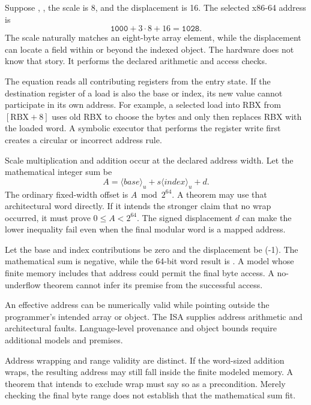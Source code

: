 Suppose , , the scale is 8, and the displacement
is 16. The selected x86-64 address is
\[
  \mathtt{1000}+3\mathbin{\cdot}8+16=\mathtt{1028}.
\]
The scale naturally matches an eight-byte array element, while the displacement
can locate a field within or beyond the indexed object. The hardware does not
know that story. It performs the declared arithmetic and access checks.

The equation reads all contributing registers from the entry state. If the
destination register of a load is also the base or index, its new value cannot
participate in its own address. For example, a selected load into RBX from
\([\mathrm{RBX}+8]\) uses old RBX to choose the bytes and only then replaces
RBX with the loaded word. A symbolic executor that performs the register write
first creates a circular or incorrect address rule.

Scale multiplication and addition occur at the declared address width. Let
the mathematical integer sum be
\[
  A=\langle base\rangle_u+s\langle index\rangle_u+d.
\]
The ordinary fixed-width offset is \(A\bmod 2^{64}\). A theorem may use that
architectural word directly. If it intends the stronger claim that no wrap
occurred, it must prove \(0\leq A<2^{64}\). The signed displacement \(d\) can
make the lower inequality fail even when the final modular word is a mapped
address.

\begin{example}[title={A valid final address after mathematical underflow}]
Let the base and index contributions be zero and the displacement be (-1).
The mathematical sum is negative, while the 64-bit word result is
. A model whose finite memory includes that address
could permit the final byte access. A no-underflow theorem cannot infer its
premise from the successful access.
\end{example}

\begin{warning}[title={Address arithmetic is not an object-bounds proof}]
An effective address can be numerically valid while pointing outside the
programmer's intended array or object. The ISA supplies address arithmetic and
architectural faults. Language-level provenance and object bounds require
additional models and premises.
\end{warning}

Address wrapping and range validity are distinct. If the word-sized addition
wraps, the resulting address may still fall inside the finite modeled memory.
A theorem that intends to exclude wrap must say so as a precondition. Merely
checking the final byte range does not establish that the mathematical sum fit.

